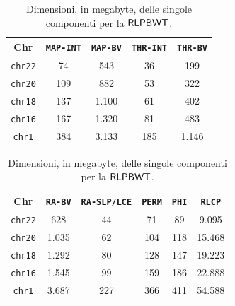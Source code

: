 \begin{table}
  \centering
  \caption{Dimensioni, in megabyte, delle singole componenti per la
    $\mbox{\rm {\sf RLPBWT}}$.} 
  \label{tab:comp}
  \begin{tabular}{c||c|c|c|c}
    \textbf{Chr} & \textbf{\texttt{MAP-INT}} & \textbf{\texttt{MAP-BV}}
    & \textbf{\texttt{THR-INT}} & \textbf{\texttt{THR-BV}} \\
    \hline
    \hline
    \texttt{chr22} & 74 & 543 & 36 & 199\\ \hline
    \texttt{chr20} & 109 & 882 & 53 & 322\\ \hline
    \texttt{chr18} & 137 & 1.100 & 61 & 402\\ \hline
    \texttt{chr16} & 167 & 1.320 & 81 & 483\\ \hline
    \texttt{chr1} & 384 & 3.133 & 185 & 1.146
  \end{tabular}
  \vspace{+3mm}
 \vspace{+1mm}
  \begin{tabular}{c||c|c|c|c|c}
    \textbf{Chr} & \textbf{\texttt{RA-BV}} & \textbf{\texttt{RA-SLP/LCE}}
    & \textbf{\texttt{PERM}} & \textbf{\texttt{PHI}} & \textbf{\texttt{RLCP}}\\
    \hline
    \hline
    \texttt{chr22} & 628 & 44 & 71 & 89 & 9.095\\ \hline
    \texttt{chr20} & 1.035 & 62 & 104 & 118 & 15.468 \\ \hline
    \texttt{chr18} & 1.292 & 80 & 128 & 147 & 19.223 \\ \hline
    \texttt{chr16} & 1.545 & 99 & 159 & 186 & 22.888\\ \hline
    \texttt{chr1} & 3.687 & 227 & 366 & 411 & 54.588
  \end{tabular}
\end{table}
